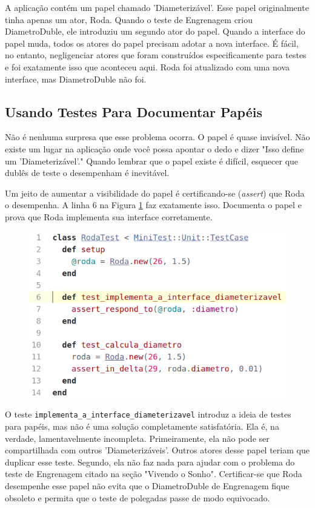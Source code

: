 A aplicação contém um papel chamado 'Diameterizável'. Esse papel originalmente
tinha apenas um ator, Roda. Quando o teste de Engrenagem criou DiametroDuble,
ele introduziu um segundo ator do papel. Quando a interface do papel muda,
todos os atores do papel precisam adotar a nova interface. É fácil, no entanto,
negligenciar atores que foram construídos especificamente para testes e foi
exatamente isso que aconteceu aqui. Roda foi atualizado com uma nova interface,
mas DiametroDuble não foi.

\subsection{Usando Testes Para Documentar Papéis}

Não é nenhuma surpresa que esse problema ocorra. O papel é quase invisível. Não
existe um lugar na aplicação onde você possa apontar o dedo e dizer "Isso
define um 'Diameterizável'." Quando lembrar que o papel existe é difícil,
esquecer que dublês de teste o desempenham é inevitável.

Um jeito de aumentar a visibilidade do papel é certificando-se (\textit{assert})
que Roda o desempenha. A linha 6 na Figura \ref{img:codigo_pag_211} faz
exatamente isso. Documenta o papel e prova que Roda implementa sua interface
corretamente.

\begin{figure}[!htbp]
  \center
  \includegraphics[scale=0.50]{imagens/codigo_pag_211.png}
  \label{img:codigo_pag_211}
\end{figure}

O teste \verb|implementa_a_interface_diameterizavel| introduz a ideia de testes
para papéis, mas não é uma solução completamente satisfatória. Ela é, na
verdade, lamentavelmente incompleta. Primeiramente, ela não pode ser
compartilhada com outros 'Diameterizáveis'. Outros atores desse papel teriam que
duplicar esse teste. Segundo, ela não faz nada para ajudar com o problema do
teste de Engrenagem citado na seção "Vivendo o Sonho". Certificar-se que Roda
desempenhe esse papel não evita que o DiametroDuble de Engrenagem fique obsoleto
e permita que o teste de polegadas passe de modo equivocado.

